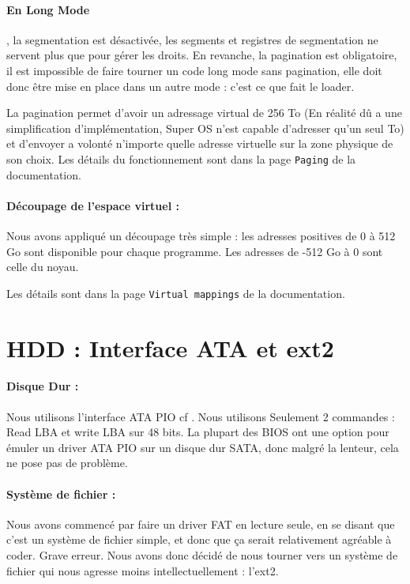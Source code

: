 \documentclass[12pt]{report}
\begin{document}
\paragraph{En Long Mode}, la segmentation est désactivée, les segments et registres de
segmentation ne servent plus que pour gérer les droits.
En revanche, la pagination est obligatoire, il est impossible de faire tourner
un code long mode sans pagination, elle doit donc être mise en place dans un
autre mode : c'est ce que fait le loader.

La pagination permet d'avoir un adressage virtual de 256 To (En réalité dû a une
simplification d'implémentation, Super OS n'est capable d'adresser qu'un seul
To) et d'envoyer a volonté n'importe quelle adresse virtuelle sur la zone
physique de son choix.
Les détails du fonctionnement sont dans la page \verb$Paging$ de la
documentation.

\paragraph{Découpage de l'espace virtuel :} Nous avons appliqué un découpage
très simple : les adresses positives de 0 à 512 Go sont disponible pour chaque
programme. Les adresses de -512 Go à 0 sont celle du noyau.

Les détails sont dans la page \verb$Virtual mappings$ de la documentation.

\section{HDD : Interface ATA et ext2}

\paragraph{Disque Dur :} Nous utilisons l'interface ATA PIO cf \cite{ATAosdev}.
Nous utilisons Seulement 2 commandes : Read LBA et write LBA sur 48 bits.
La plupart des BIOS ont une option pour émuler un driver ATA PIO sur un
disque dur SATA, donc malgré la lenteur, cela ne pose pas de problème.

\paragraph{Système de fichier :} Nous avons commencé par faire un driver FAT en lecture seule, en se disant que c'est un système de fichier simple, et donc que ça serait relativement agréable à coder.
Grave erreur.
Nous avons donc décidé de nous tourner vers un système de fichier qui nous agresse moins intellectuellement : l'ext2.
\end{document}

